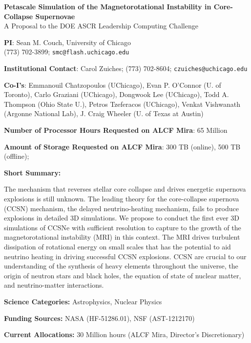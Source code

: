 \documentclass[12pt,letterpaper]{article}
\newcommand{\doctitle}{Petascale Simulation of the Magnetorotational
  Instability in Core-Collapse Supernovae}
\begin{document}
\setlength{\parindent}{0in}

\pagestyle{fancy} 
\renewcommand{\headrulewidth}{0.0pt}

\begin{center} \textbf{\doctitle{}} \\
  A Proposal to the DOE ASCR Leadership Computing Challenge
\end{center}

\begin{flushleft}
\textbf{PI}:
Sean M. Couch, University of Chicago \\
(773) 702-3899; \texttt{smc@flash.uchicago.edu}
\medskip

\textbf{Institutional Contact}:
Carol Zuiches; (773) 702-8604; \texttt{czuiches@uchicago.edu}
\medskip

\textbf{Co-I's}:
Emmanouil Chatzopoulos (UChicago),
Evan P. O'Connor (U. of Toronto),
Carlo Graziani (UChicago),
Dongwook Lee (UChicago), 
Todd A. Thompson (Ohio State U.),
Petros Tzeferacos (UChicago), 
Venkat Vishwanath (Argonne National Lab),
J. Craig Wheeler (U. of Texas at Austin)
\medskip

\textbf{Number of Processor Hours Requested on ALCF Mira}: 
65 Million
\medskip

\textbf{Amount of Storage Requested on ALCF Mira}: 
300 TB (online), 500 TB (offline); 
\medskip

\textbf{Short Summary:} 

{\parindent 16pt

  The mechanism that reverses stellar core collapse and drives
  energetic supernova explosions is still unknown.
  The leading theory for the core-collapse supernova (CCSN) mechanism,
  the delayed neutrino-heating mechanism, fails to produce explosions
  in detailed 3D simulations.
  We propose to conduct the first ever 3D simulations of CCSNe with
  sufficient resolution to capture to the growth of the
  magnetorotational instability (MRI) in this context.
  The MRI drives turbulent dissipation of rotational energy on small
  scales that has the potential to aid neutrino heating in driving
  successful CCSN explosions.
  CCSN are crucial to our understanding of the synthesis of heavy
  elements throughout the universe, the origin of neutron stars and
  black holes, the equation of state of nuclear matter, and
  neutrino-matter interactions.

}
\medskip

\textbf{Science Categories:}  Astrophysics, Nuclear Physics
\medskip

\textbf{Funding Sources:}  NASA (HF-51286.01), NSF (AST-1212170)
\medskip

\textbf{Current Allocations:}  30 Million hours (ALCF Mira,
Director's Discretionary)

\end{flushleft}
\end{document}
